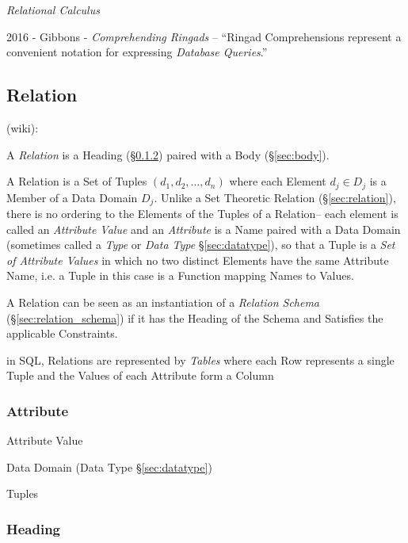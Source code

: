 \emph{Relational Calculus}


2016 - Gibbons - \emph{Comprehending Ringads} -- ``Ringad Comprehensions
represent a convenient notation for expressing \emph{Database Queries}.''



\subsection{Relation}\label{sec:database_relation}

(wiki):

A \emph{Relation} is a Heading (\S\ref{sec:heading}) paired with a Body
(\S\ref{sec:body}).

A Relation is a Set of Tuples $(d_1, d_2, \ldots, d_n)$ where each Element $d_j
\in D_j$ is a Member of a Data Domain $D_j$. Unlike a Set Theoretic Relation
(\S\ref{sec:relation}), there is no ordering to the Elements of the Tuples of a
Relation-- each element is called an \emph{Attribute Value} and an
\emph{Attribute} is a Name paired with a Data Domain (sometimes called a
\emph{Type} or \emph{Data Type} \S\ref{sec:datatype}), so that a Tuple is a
\emph{Set of Attribute Values} in which no two distinct Elements have the same
Attribute Name, i.e. a Tuple in this case is a Function mapping Names to
Values.

A Relation can be seen as an instantiation of a \emph{Relation Schema}
(\S\ref{sec:relation_schema}) if it has the Heading of the Schema and Satisfies
the applicable Constraints.

in SQL, Relations are represented by \emph{Tables} where each Row represents a
single Tuple and the Values of each Attribute form a Column



\subsubsection{Attribute}\label{sec:database_attribute}

Attribute Value

Data Domain (Data Type \S\ref{sec:datatype})

Tuples



\subsubsection{Heading}\label{sec:heading}

